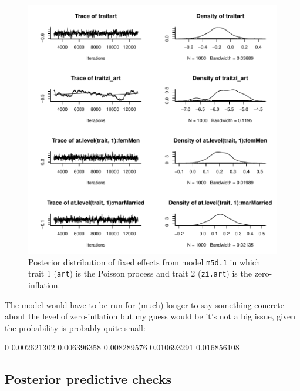 \documentclass{article}
\begin{document}
\begin{figure}[!h]
\begin{center}
\includegraphics{Lecture5-039}
\end{center}
\caption{Posterior distribution of fixed effects from model \texttt{m5d.1} in which trait 1 (\texttt{art}) is the Poisson process and trait 2 (\texttt{zi.art}) is the zero-inflation.}
\label{ZIP}
\end{figure}

The model would have to be run for (much) longer to say something concrete about the level of zero-inflation but my guess would be it's not a big issue, given the probability is probably quite small:

\begin{Schunk}
\begin{Soutput}
         0%
0.002621302 0.006396358 0.008289576 0.010693291 0.016856108 
\end{Soutput}
\end{Schunk}

\subsection{Posterior predictive checks}
\end{document}
